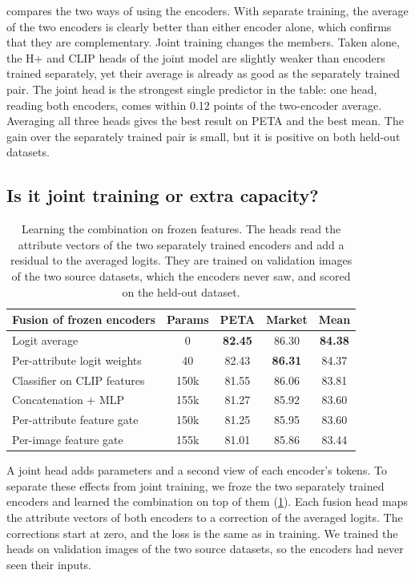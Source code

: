 \documentclass[10pt,twocolumn,letterpaper]{article}
\begin{document}
 compares the two ways of using the encoders. With separate training, the average of the two encoders is clearly better than either encoder alone, which confirms that they are complementary. Joint training changes the members. Taken alone, the H+ and CLIP heads of the joint model are slightly weaker than encoders trained separately, yet their average is already as good as the separately trained pair. The joint head is the strongest single predictor in the table: one head, reading both encoders, comes within 0.12 points of the two-encoder average. Averaging all three heads gives the best result on PETA and the best mean. The gain over the separately trained pair is small, but it is positive on both held-out datasets.

\subsection{Is it joint training or extra capacity?}
\label{sec:frozen}

\begin{table}[t]
\centering
\small
\setlength{\tabcolsep}{4pt}
\begin{tabular}{@{}lcccc@{}}
\toprule
Fusion of frozen encoders & Params & PETA & Market & Mean \\
\midrule
Logit average & 0 & \textbf{82.45} & 86.30 & \textbf{84.38} \\
Per-attribute logit weights & 40 & 82.43 & \textbf{86.31} & 84.37 \\
Classifier on CLIP features & 150k & 81.55 & 86.06 & 83.81 \\
Concatenation + MLP & 155k & 81.27 & 85.92 & 83.60 \\
Per-attribute feature gate & 150k & 81.25 & 85.95 & 83.60 \\
Per-image feature gate & 155k & 81.01 & 85.86 & 83.44 \\
\bottomrule
\end{tabular}
\caption{Learning the combination on frozen features. The heads read the attribute vectors of the two separately trained encoders and add a residual to the averaged logits. They are trained on validation images of the two source datasets, which the encoders never saw, and scored on the held-out dataset.}
\label{tab:frozen}
\end{table}

A joint head adds parameters and a second view of each encoder's tokens. To separate these effects from joint training, we froze the two separately trained encoders and learned the combination on top of them (\cref{tab:frozen}). Each fusion head maps the attribute vectors of both encoders to a correction of the averaged logits. The corrections start at zero, and the loss is the same as in training. We trained the heads on validation images of the two source datasets, so the encoders had never seen their inputs.
\end{document}

